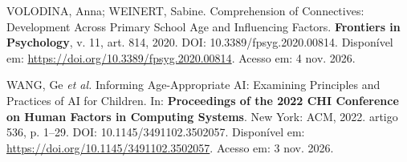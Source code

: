 VOLODINA, Anna; WEINERT, Sabine. Comprehension of Connectives: Development Across Primary School Age and Influencing Factors. \textbf{Frontiers in Psychology}, v. 11, art. 814, 2020. DOI: 10.3389/fpsyg.2020.00814. Disponível em: \url{https://doi.org/10.3389/fpsyg.2020.00814}. Acesso em: 4 nov. 2026.

WANG, Ge \textit{et al.} Informing Age-Appropriate AI: Examining Principles and Practices of AI for Children. In: \textbf{Proceedings of the 2022 CHI Conference on Human Factors in Computing Systems}. New York: ACM, 2022. artigo 536, p. 1--29. DOI: 10.1145/3491102.3502057. Disponível em: \url{https://doi.org/10.1145/3491102.3502057}. Acesso em: 3 nov. 2026.

\endgroup

